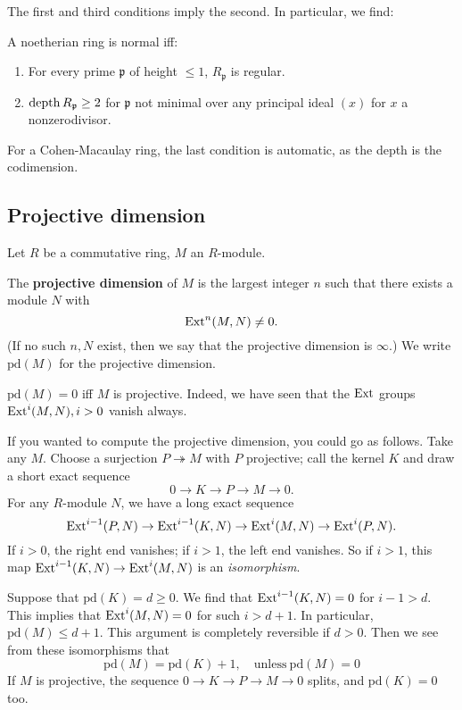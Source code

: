The first and third conditions imply the second. In particular,
we find:

\begin{theorem} A noetherian ring is normal
iff:
\begin{enumerate}
\item For every prime $\mathfrak{p}$ of height $\leq 1$,
$R_{\mathfrak{p}} $ is regular.
\item $\operatorname{depth} R_{\mathfrak{p}} \geq 2$ for $\mathfrak{p}$ not
minimal over any
principal ideal $(x)$ for $x$ a nonzerodivisor. \end{enumerate}
\end{theorem}
For a Cohen-Macaulay ring, the last condition is automatic, as
the depth is the
codimension.

\subsection{Projective dimension}

\newcommand{\pr}{\mathrm{pd}}
Let $R$ be a commutative ring, $M$ an $R$-module.

\begin{definition}
The \textbf{projective dimension} of $M$ is the largest integer
$n$ such that
there exists  a module $N$ with
\[ \operatorname{Ext}^n(M,N) \neq 0.  \]
(If no such $n,N$ exist, then we say that the projective
dimension is $\infty$.)
We write $\pr(M)$ for the projective dimension.
\end{definition}

\begin{remark}
$\pr(M) = 0$ iff $M$ is projective. Indeed, we have seen that
the $\operatorname{Ext}$ groups
$\operatorname{Ext}^i(M,N), i >0$
vanish always.
\end{remark}

If you wanted to compute the projective dimension, you could go
as follows.
Take any $M$. Choose a surjection $P \twoheadrightarrow M$ with
$P$ projective;
call the kernel $K$ and draw a short exact sequence
\[ 0 \to K \to P \to M \to 0.  \]
For any $R$-module $N$, we have a long exact sequence
\[ \operatorname{Ext}^{i-1}(P,N) \to \operatorname{Ext}^{i-1}(K,N) \to \operatorname{Ext}^i(M,N) \to
\operatorname{Ext}^i(P, N). \]
If $i >0$, the right end vanishes; if $i >1$, the left end
vanishes. So if $i
>1$, this map $\operatorname{Ext}^{i-1}(K,N) \to \operatorname{Ext}^i(M,N)$ is an
\emph{isomorphism}.

Suppose that $\pr(K) = d \geq 0$. We find that
$\operatorname{Ext}^{i-1}(K,N)=0$ for $i-1
> d$.
This implies that $\operatorname{Ext}^i(M,N) = 0$ for such $i > d+1$. In
particular, $\pr(M)
\leq d+1$.
This argument is completely reversible if $d >0$.
Then we see from these isomorphisms that
\[ \boxed{\pr(M) = \pr(K)+1}, \quad \mathrm{unless} \ \pr(M)=0
\]
If $M$ is projective, the sequence $0 \to K \to P \to M \to 0$
splits, and
$\pr(K)=0$ too.

